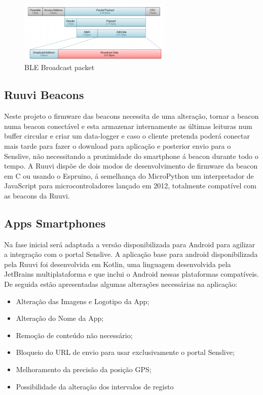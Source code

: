 \begin{figure}[htb]
\centering
\includegraphics[width=0.65\textwidth]{images/blepacket.png}
\caption{BLE Broadcast packet\cite{blepacket}}\label{blepacket}
\end{figure}


\subsection{Ruuvi Beacons}
\par Neste projeto o firmware das beacons necessita de uma alteração, tornar a beacon numa beacon conectável e esta armazenar internamente as últimas leituras num buffer circular e criar um data-logger e caso o cliente pretenda poderá conectar mais tarde para fazer o download para aplicação e posterior envio para o Senslive, não necessitando a proximidade do smartphone á beacon durante todo o tempo. A Ruuvi dispõe de dois modos de desenvolvimento de firmware da beacon em C ou usando o Espruino, á semelhança do MicroPython um interpretador de JavaScript para microcontroladores lançado em 2012, totalmente compatível com as beacons da Ruuvi.
\subsection{Apps Smartphones}
Na fase inicial será adaptada a versão disponibilizada para Android para agilizar a integração com o portal Senslive. A aplicação base para android disponibilizada pela Ruuvi foi desenvolvida em Kotlin\cite{ruuviappgithub}, uma linguagem desenvolvida pela JetBrains multiplataforma e que inclui o Android nessas plataformas compatíveis.
De seguida estão apresentadas algumas alterações necessárias na aplicação:
\begin{itemize}
\item Alteração das Imagens e Logotipo da App;
\item Alteração do Nome da App;
\item Remoção de conteúdo não necessário;
\item Bloqueio do URL de envio para usar exclusivamente o portal Senslive;
\item Melhoramento da precisão da posição GPS;
\item Possibilidade da alteração dos intervalos de registo
\end{itemize}

